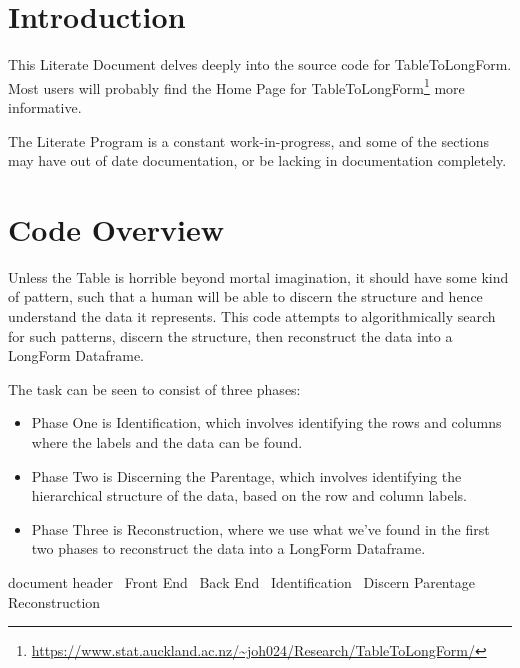 \documentclass[a4paper]{article}
\begin{document}
\section{Introduction}
\label{sec:introduction}
This Literate Document delves deeply into the source code for
TableToLongForm. Most users will probably find the Home Page for
TableToLongForm\footnote{\url{https://www.stat.auckland.ac.nz/~joh024/Research/TableToLongForm/}}
more informative.

The Literate Program is a constant work-in-progress, and some of the
sections may have out of date documentation, or be lacking in
documentation completely.

\newpage
\section{Code Overview}
\label{sec:code.overview}
Unless the Table is horrible beyond mortal imagination, it should have
some kind of pattern, such that a human will be able to discern the
structure and hence understand the data it represents. This code
attempts to algorithmically search for such patterns, discern the
structure, then reconstruct the data into a LongForm Dataframe.

The task can be seen to consist of three phases:
\begin{itemize}
\item Phase One is Identification, which involves identifying the rows
  and columns where the labels and the data can be found.
\item Phase Two is Discerning the Parentage, which involves
  identifying the hierarchical structure of the data, based on the row
  and column labels.
\item Phase Three is Reconstruction, where we use what we've found in
  the first two phases to reconstruct the data into a LongForm
  Dataframe.
\end{itemize}
\endmoddef\let\nwnotused=\nwoutput{}
\LA{}document header~{\nwtagstyle{}}\RA{}
\LA{}Front End~{\nwtagstyle{}}\RA{}
\LA{}Back End~{\nwtagstyle{}}\RA{}
\LA{}Identification~{\nwtagstyle{}}\RA{}
\LA{}Discern Parentage~{\nwtagstyle{}}\RA{}
\LA{}Reconstruction~{\nwtagstyle{}}\RA{}
\nwnotused{TableToLongForm.R}\nwendcode{}\nwdocspar
\end{document}
